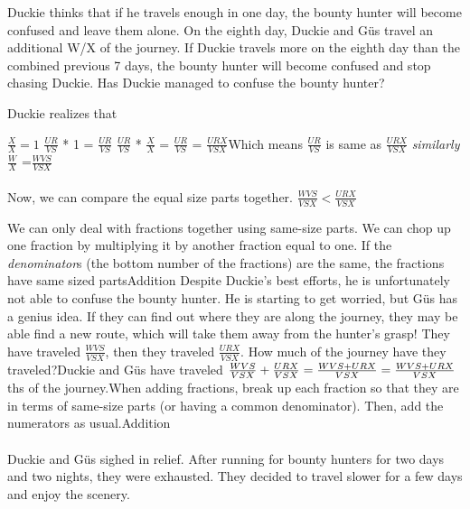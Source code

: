 \documentclass[a4paper,11pt ]{book}
\begin{document}
{Duckie thinks that if he travels enough in one day, the bounty hunter will become confused and leave them alone. On the eighth day, Duckie and Güs travel an additional W/X of the journey. If Duckie travels more on the eighth day than the combined previous 7 days, the bounty hunter will become confused and stop chasing Duckie. Has Duckie managed to confuse the bounty hunter?}{Duckie realizes that \begin{center}
    $\frac{X}{X}=1$ \linebreak
    $\frac{UR}{VS}$ * 1 = $\frac{UR}{VS}$ \linebreak
    $\frac{UR}{VS}$ * $\frac{X}{X}$ = $\frac{UR}{VS}$ = $\frac{URX}{VSX}$\linebreak  Which means $\frac{UR}{VS}$  is same as  $\frac{URX}{VSX}$ \linebreak\linebreak
    \textit{similarly}
    $\frac{W}{X}$ =$\frac{WVS}{VSX}$
\end{center}
\paragraph{} Now, we can compare the equal size parts together. $\frac{WVS}{VSX} < \frac{URX}{VSX}$}{We can only deal with fractions together using same-size parts. We can chop up one fraction by multiplying it by another fraction equal to one. If the \textit{denominator}s (the bottom number of the fractions) are the same, the fractions have same sized parts}{Addition}
{Despite Duckie's best efforts, he is unfortunately not able to confuse the bounty hunter. He is starting to get worried, but Güs has a genius idea. If they can find out where they are along the journey, they may be able find a new route, which will take them away from the hunter's grasp! They have traveled $\frac{WVS}{VSX}$, then they traveled $\frac{URX}{VSX}$. How much of the journey have they traveled?}{Duckie and Güs have traveled
$\frac{WVS}{VSX}+\frac{URX}{VSX}\linebreak=\frac{WVS+URX}{VSX}\linebreak=\frac{WVS+URX}{VSX}$ths of the journey.}{When adding fractions, break up each fraction so that they are in terms of same-size parts (or having a common denominator). Then, add the numerators as usual.}{Addition}
\paragraph{} Duckie and Güs sighed in relief. After running for bounty hunters for two days and two nights, they were exhausted. They decided to travel slower for a few days and enjoy the scenery. 
\end{document}
